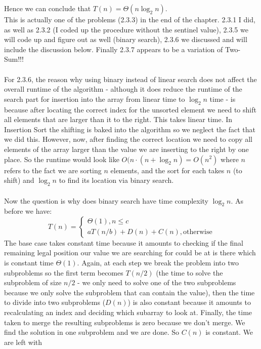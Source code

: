 \documentclass{scrartcl}
\theoremstyle{definition}
\theoremstyle{definition}
\theoremstyle{remark}
\numberwithin{equation}{section}
\begin{document}
Hence we can conclude that $T(n)=\Theta(n\log_2n)$.\\
This is actually one of the problems (2.3.3) in the end of the chapter. 2.3.1 I did, as well as 2.3.2 (I coded up the procedure without the sentinel value), 2.3.5 we will code up and figure out as well (binary search), 2.3.6 we discussed and will include the discussion below. Finally 2.3.7 appears to be a variation of Two-Sum!!!\\
\\
For 2.3.6, the reason why using binary instead of linear search does not affect the overall runtime of the algorithm - although it does reduce the runtime of the search part for insertion into the array from linear time to $\log_2n$ time - is because after locating the correct index for the unsorted element we need to shift all elements that are larger than it to the right. This takes linear time. In Insertion Sort the shifting is baked into the algorithm so we neglect the fact that we did this. However, now, after finding the correct location we need to copy all elements of the array larger than the value we are inserting to the right by one place. So the runtime would look like $O(n\cdot(n + \log_2n)=O(n^2)$ where $n$ refers to the fact we are sorting $n$ elements, and the sort for each takes $n$ (to shift) and $\log_2n$ to find its location via binary search.\\
\\
Now the question is why does binary search have time complexity $\log_2n$. As before
we have:
$$T(n)=\begin{cases}
    \Theta(1), n\leq c\\
    aT(n/b) + D(n) + C(n), \text{otherwise}
\end{cases}$$
The base case takes constant time because it amounts to checking if the final remaining legal position our value we are searching for could be at is there which is constant time $\Theta(1)$. Again, at each step we break the problem into two subproblems so the first term becomes $T(n/2)$ (the time to solve the subproblem of size $n/2$ - we only need to solve one of the two subproblems because we only solve the subproblem that can contain the value), then the time to divide into two subproblems ($D(n)$) is also constant because it amounts to recalculating an index and deciding which subarray to look at. Finally, the time taken to merge the resulting subproblems is zero because we don't merge. We find the solution in one subproblem and we are done. So $C(n)$ is constant. We are left with
\end{document}
